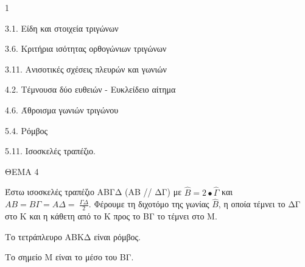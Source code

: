 \begin{ylh}{1}
    \item 3.1. Είδη και στοιχεία τριγώνων
    \item 3.6. Κριτήρια ισότητας ορθογώνιων τριγώνων
    \item 3.11. Ανισοτικές σχέσεις πλευρών και γωνιών
    \item 4.2. Τέμνουσα δύο ευθειών - Ευκλείδειο αίτημα
    \item 4.6. Άθροισμα γωνιών τριγώνου
    \item 5.4. Ρόμβος
    \item 5.11. Ισοσκελές τραπέζιο.
\end{ylh}

ΘΕΜΑ 4

Έστω ισοσκελές τραπέζιο ΑΒΓΔ (ΑΒ // ΔΓ) με $\widehat{Β} = 2 \bullet \widehat{\Gamma}$ και $ΑΒ = Β\Gamma = Α\Delta = \ \frac{\Gamma\Delta}{2}$. Φέρουμε τη διχοτόμο της γωνίας $\widehat{Β}$, η οποία τέμνει το ΔΓ στο Κ και η κάθετη από το Κ προς το ΒΓ το τέμνει στο Μ.

\begin{alist}
\item Να υπολογίσετε τις γωνίες του ΑΒΓΔ. 

\item Να αποδείξετε ότι:

.}
\end{alist}
\begin{alist}
\item
  Το τετράπλευρο ΑΒΚΔ είναι ρόμβος. 
\item
  Το σημείο Μ είναι το μέσο του ΒΓ. 


\end{alist}
